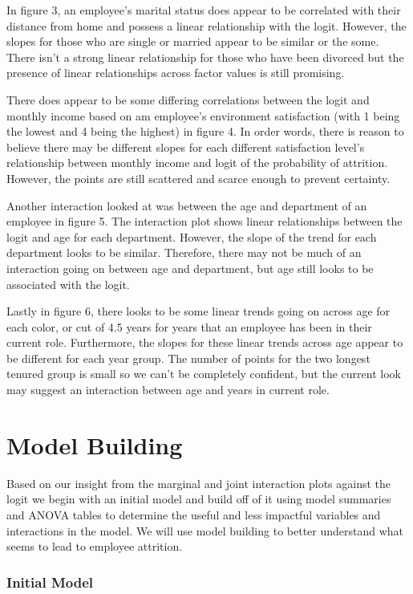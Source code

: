 \documentclass[]{article}
\begin{document}
In figure 3, an employee's marital status does appear to be correlated
with their distance from home and possess a linear relationship with the
logit. However, the slopes for those who are single or married appear to
be similar or the some. There isn't a strong linear relationship for
those who have been divorced but the presence of linear relationships
across factor values is still promising.

There does appear to be some differing correlations between the logit
and monthly income based on am employee's environment satisfaction (with
1 being the lowest and 4 being the highest) in figure 4. In order words,
there is reason to believe there may be different slopes for each
different satisfaction level's relationship between monthly income and
logit of the probability of attrition. However, the points are still
scattered and scarce enough to prevent certainty.

Another interaction looked at was between the age and department of an
employee in figure 5. The interaction plot shows linear relationships
between the logit and age for each department. However, the slope of the
trend for each department looks to be similar. Therefore, there may not
be much of an interaction going on between age and department, but age
still looks to be associated with the logit.

Lastly in figure 6, there looks to be some linear trends going on across
age for each color, or cut of 4.5 years for years that an employee has
been in their current role. Furthermore, the slopes for these linear
trends across age appear to be different for each year group. The number
of points for the two longest tenured group is small so we can't be
completely confident, but the current look may suggest an interaction
between age and years in current role.

\hypertarget{model-building}{%
\section{Model Building}\label{model-building}}

Based on our insight from the marginal and joint interaction plots
against the logit we begin with an initial model and build off of it
using model summaries and ANOVA tables to determine the useful and less
impactful variables and interactions in the model. We will use model
building to better understand what seems to lead to employee attrition.

\hypertarget{initial-model}{%
\subsubsection{Initial Model}\label{initial-model}}
\end{document}
